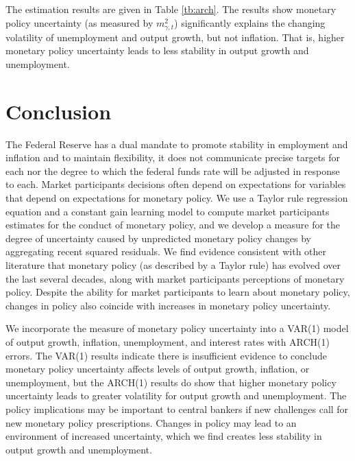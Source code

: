 \documentclass[12pt]{article}
\begin{document}
The estimation results are given in Table \ref{tb:arch}.  The results show monetary policy uncertainty (as measured by $m_{\gamma,t}^2$) significantly explains the changing volatility of unemployment and output growth, but not inflation.  That is, higher monetary policy uncertainty leads to less stability in output growth and unemployment.

\section{Conclusion}
The Federal Reserve has a dual mandate to promote stability in employment and inflation and to maintain flexibility, it does not communicate precise targets for each nor the degree to which the federal funds rate will be adjusted in response to each.  Market participants decisions often depend on expectations for variables that depend on expectations for monetary policy.  We use a Taylor rule regression equation and a constant gain learning model to compute market participants estimates for the conduct of monetary policy, and we develop a measure for the degree of uncertainty caused by unpredicted monetary policy changes by aggregating recent squared residuals.  We find evidence consistent with other literature that monetary policy (as described by a Taylor rule) has evolved over the last several decades, along with market participants perceptions of monetary policy.  Despite the ability for market participants to learn about monetary policy, changes in policy also coincide with increases in monetary policy uncertainty.  

We incorporate the measure of monetary policy uncertainty into a VAR(1) model of output growth, inflation, unemployment, and interest rates with ARCH(1) errors.  The VAR(1) results indicate there is insufficient evidence to conclude monetary policy uncertainty affects levels of output growth, inflation, or unemployment, but the ARCH(1) results do show that higher monetary policy uncertainty leads to greater volatility for output growth and unemployment.  The policy implications may be important to central bankers if new challenges call for new monetary policy prescriptions.  Changes in policy may lead to an environment of increased uncertainty, which we find creates less stability in output growth and unemployment.

\newpage
\nocite{*}


\newpage
\end{document}
